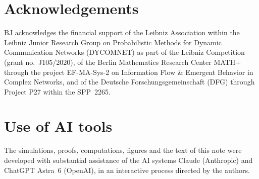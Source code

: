 \documentclass[11pt,letterpaper]{article}
\begin{document}
\section*{Acknowledgements}

BJ acknowledges the financial support of the Leibniz Association within the Leibniz Junior Research Group on Probabilistic Methods for Dynamic Communication Networks (DYCOMNET) as part of the Leibniz Competition (grant no.~J105/2020), of the Berlin Mathematics Research Center MATH+ through the project EF-MA-Sys-2 on Information Flow \& Emergent Behavior in Complex Networks, and of the Deutsche Forschungsgemeinschaft (DFG) through Project P27 within the SPP~2265.

\section*{Use of AI tools}

The simulations, proofs, computations, figures and the text of this note were developed with substantial assistance of the AI systems Claude (Anthropic) and ChatGPT Astra~6 (OpenAI), in an interactive process directed by the authors.



\end{document}
